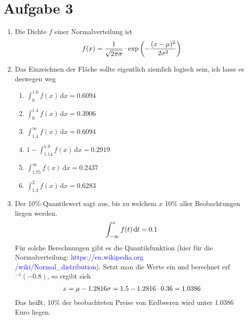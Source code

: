 \documentclass{article}
\begin{document}
	\section*{Aufgabe 3}
	\begin{enumerate}[label=(\alph*)]
		\item Die Dichte $f$ einer Normalverteilung ist
		\begin{align}
			f(x) = \frac{1}{\sqrt{2\pi\sigma}}\cdot\exp\left(-\frac{(x-\mu)^2}{2\sigma^2}\right) \notag
		\end{align}
		\begin{center}
		\end{center}
		\item Das Einzeichnen der Fläche sollte eigentlich ziemlich logisch sein, ich lasse es deswegen weg
		\begin{enumerate}[label=(\roman*)]
			\item $\int_{0}^{1.6} f(x)\,\mathrm{d}x = 0.6094$
			\item $\int_{0}^{1.4} f(x)\,\mathrm{d}x = 0.3906$
			\item $\int_{1.4}^{\infty} f(x)\,\mathrm{d}x = 0.6094$
			\item $1-\int_{1.14}^{1.9} f(x)\,\mathrm{d}x = 0.2919$
			\item $\int_{1.75}^{\infty} f(x)\,\mathrm{d}x = 0.2437$
			\item $\int_{1.3}^{2} f(x)\,\mathrm{d}x = 0.6283$
		\end{enumerate}
		\item Der 10\%-Quantilswert sagt aus, bis zu welchem $x$ 10\% aller Beobachtungen liegen werden.
		\begin{align}
			\int_{-\infty}^{x} f(t)\,\mathrm{d}t = 0.1 \notag
		\end{align}
		Für solche Berechnungen gibt es die Quantilsfunktion (hier für die Normalverteilung: \textcolor{blue}{https://en.wikipedia.org\\/wiki/Normal\_distribution}). Setzt man die Werte ein und berechnet erf$^{-1}(-0.8)$, so ergibt sich
		\begin{align}
			x = \mu-1.2816\sigma = 1.5 - 1.2816\cdot 0.36 = 1.0386 \notag
		\end{align}
		Das heißt, 10\% der beobachteten Preise von Erdbeeren wird unter 1.0386 Euro liegen.
	\end{enumerate}
	
\end{document}
